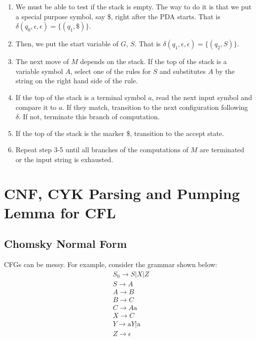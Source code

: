 \documentclass[11pt]{article}
\begin{document}
\begin{enumerate}

\item We must be able to test if the stack is empty. The way to do it is that we put a
special purpose symbol, say \$, right after the PDA starts. That is $\delta(q_0,\epsilon,\epsilon) = \{(q_1,\mathrm{\$})\}$.

\item Then, we put the start variable of $G$, $S$. That is
$\delta(q_1,\epsilon,\epsilon) = \{(q_2,S)\}$.

\item The next move of $M$ depends on the stack. If the top of the stack is a variable symbol $A$,
select one of the rules for $S$ and substitutes $A$ by the string on the right hand side of the
rule.

\item If the top of the stack is a terminal symbol $a$, read the next input symbol and compare it
to $a$. If they match, transition to the next configuration following $\delta$. If not, terminate
this branch of computation.

\item If the top of the stack is the marker \$, transition to the accept state.

\item Repeat step 3-5 until all branches of the computations of $M$ are terminated or the input
string is exhausted.

\end{enumerate}

\section{CNF, CYK Parsing and Pumping Lemma for CFL}

\subsection{Chomsky Normal Form}

CFGs can be messy. For example, consider the grammar shown below:
\begin{align*}
&S_0 \rightarrow S|X|Z \\
&S \rightarrow A \\
&A \rightarrow B \\
&B \rightarrow C \\
&C \rightarrow A\mathrm{a} \\
&X \rightarrow C \\
&Y \rightarrow \mathrm{a}Y|\mathrm{a} \\
&Z \rightarrow \epsilon
\end{align*}
\end{document}
